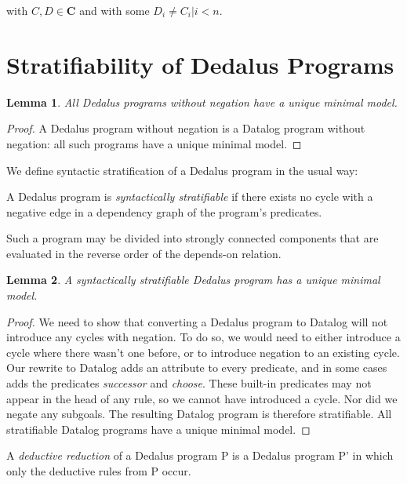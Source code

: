 \documentclass{acm_proc_article-sp-sigmod09}
\begin{document}
with $C, D \in \textbf{C}$ and with some $D_{i} \neq C_{i} | i < n$.

\section{Stratifiability of Dedalus Programs}

\newtheorem{lemma}{Lemma}
\begin{lemma}
All Dedalus programs without negation have a unique minimal model.
\end{lemma}

\begin{proof}
A Dedalus program without negation is a Datalog program without negation: all such programs have a
unique minimal model.
\end{proof}

We define syntactic stratification of a Dedalus program in the usual way: 

\begin{definition}
A Dedalus program is \emph{syntactically stratifiable} if there exists no cycle with a negative edge in a dependency graph of the program's predicates.
\end{definition}

Such a program may be divided into strongly connected components that are evaluated in the reverse order of the depends-on
relation.

\begin{lemma}
A syntactically stratifiable Dedalus program has a unique minimal model.
\end{lemma}

\begin{proof}
We need to show that converting a Dedalus program to Datalog will not introduce any cycles with negation.  To do so, we would need to either
introduce a cycle where there wasn't one before, or to introduce negation to an existing cycle.  Our rewrite to Datalog adds an attribute
to every predicate, and in some cases adds the predicates \emph{successor} and \emph{choose}.  These built-in predicates may not appear 
in the head of any rule, so we cannot have introduced a cycle.  Nor did we negate any subgoals.  The resulting Datalog program is therefore
stratifiable.  All stratifiable Datalog programs have a unique minimal model.
\end{proof}


\begin{definition}
A \emph{deductive reduction} of a Dedalus program P is a Dedalus program P' in which only the deductive rules from P occur.
\end{definition}
\end{document}
